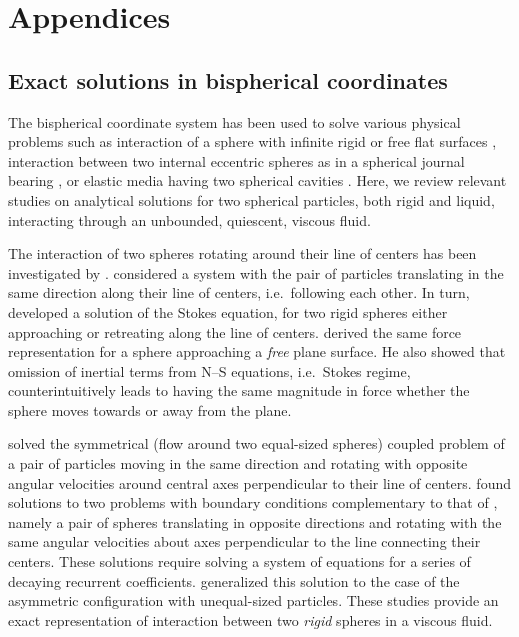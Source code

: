 \documentclass[../thesis.tex]{subfiles}
\begin{document}
\appendix
\renewcommand{\arraystretch}{1.25}
\section{Appendices}

\subsection{Exact solutions in bispherical coordinates\label{sec:bi}}
The bispherical coordinate system has been used to solve various physical problems such as interaction of a sphere with infinite rigid or free flat surfaces \cite{B61}, interaction between two internal eccentric spheres as in a spherical journal bearing \cite{J15}, or elastic media having two spherical cavities \cite{SS52}. Here, we review relevant studies on analytical solutions for two spherical particles, both rigid and liquid, interacting through an unbounded, quiescent, viscous fluid.

The interaction of two spheres rotating around their line of centers has been investigated by \citet{J15}. \citet{SJ26} considered a system with the pair of particles translating in the same direction along their line of centers, i.e.\ following each other. In turn, \citet{M61} developed a solution of the Stokes equation, for two rigid spheres either approaching or retreating along the line of centers. \citet{B61} derived the same force representation for a sphere approaching a \textit{free} plane surface. He also showed that omission of inertial terms from N--S equations, i.e.\ Stokes regime, counterintuitively leads to having the same magnitude in force whether the sphere moves towards or away from the plane.

\citet{GCB66} solved the symmetrical (flow around two equal-sized spheres) coupled problem of a pair of particles moving in the same direction and rotating with opposite angular velocities around central axes perpendicular to their line of centers. \citet{ON69} found solutions to two problems with boundary conditions complementary to that of \citet{GCB66}, namely a pair of spheres translating in opposite directions and rotating with the same angular velocities about axes perpendicular to the line connecting their centers. These solutions require solving a system of equations for a series of decaying recurrent coefficients. \citet{ONM70} generalized this solution to the case of the asymmetric configuration with unequal-sized particles. These studies provide an exact representation of interaction between two \textit{rigid} spheres in a viscous fluid. 
\end{document}

